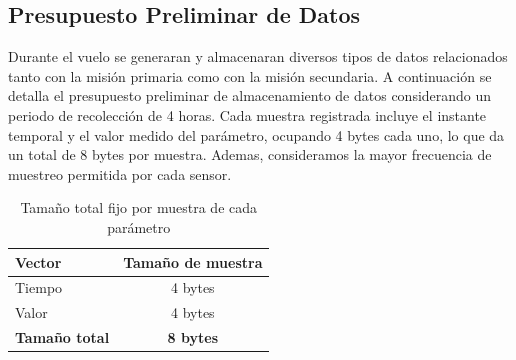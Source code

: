     \begin{table}[H]
    \centering
    \caption{Consumo de corriente y potencia de los componentes en el caso más desfavorable.}
    \label{tab:consumo_componentes}
    \end{table}

  \subsection{Presupuesto Preliminar de Datos}
    Durante el vuelo se generaran y almacenaran diversos tipos de datos relacionados tanto
    con la misión primaria como con la misión secundaria. A continuación se detalla el presupuesto preliminar de almacenamiento de datos considerando un periodo de recolección de 4
    horas.
    Cada muestra registrada incluye el instante temporal y el valor medido del parámetro, ocupando 4 bytes cada uno, lo que da un total de 8 bytes por muestra. Ademas, consideramos
    la mayor frecuencia de muestreo permitida por cada sensor.

    \begin{table}[H]
    \centering
    \begin{tabular}{|l|c|}
    \hline
    \textbf{Vector} & \textbf{Tamaño de muestra} \\
    \hline
    Tiempo & 4 bytes \\
    Valor  & 4 bytes \\
    \hline
    \textbf{Tamaño total} & \textbf{8 bytes} \\
    \hline
    \end{tabular}
    \caption{Tamaño total fijo por muestra de cada parámetro}
    \label{tab:tamanio_muestra}
    \end{table}

